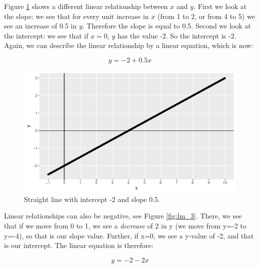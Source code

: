 \documentclass[]{report}\usepackage[]{graphicx}\usepackage[]{color}
\makeatletter
\def\maxwidth{ %
  \ifdim\Gin@nat@width>\linewidth
    \linewidth
  \else
    \Gin@nat@width
  \fi
}
\newenvironment{knitrout}{}{} %
\makeatother
\begin{document}
Figure \ref{fig:lm_2} shows a different linear relationship between $x$ and $y$. First we look at the slope: we see that for every unit increase in $x$ (from 1 to 2, or from 4 to 5) we see an increase of 0.5 in $y$. Therefore the slope is equal to 0.5. Second we look at the intercept: we see that if $x=0$, $y$ has the value -2. So the intercept is -2. Again, we can describe the linear relationship by a linear equation, which is now:

\begin{equation}
y = -2 + 0.5 x
\end{equation}



\begin{knitrout}
\color{fgcolor}\begin{figure}

{\centering \includegraphics[width=\maxwidth]{figure/lm_2-1} 

}

\caption[Straight line with intercept -2 and slope 0.5]{Straight line with intercept -2 and slope 0.5.}\label{fig:lm_2}
\end{figure}


\end{knitrout}


Linear relationships can also be negative, see Figure \ref{fig:lm_3}. There, we see that if we move from 0 to 1, we see a \textit{decrease} of 2 in y (we move from y=-2 to y=-4), so that is our slope value. Further, if x=0, we see a y-value of -2, and that is our intercept. The linear equation is therefore:

\begin{equation}
y = -2 - 2 x
\end{equation}
\end{document}

